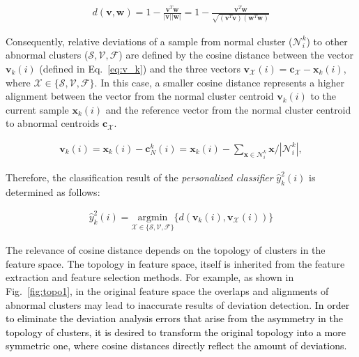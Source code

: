 \begin{align}
\label{eq:cosine}
d(\mathbf{v},\mathbf{w})= 1 - \frac{\mathbf{v}^T\mathbf{w}}{|\mathbf{v}||\mathbf{w}|}=1 - \frac{\mathbf{v}^T\mathbf{w}}{\sqrt{(\mathbf{v}^T\mathbf{v})(\mathbf{w}^T\mathbf{w})}}
\end{align}

Consequently, relative deviations of a sample from normal cluster ($\mathcal{N}_i^k$) to other abnormal clusters ($\mathcal{S},\mathcal{V},\mathcal{F}$) are defined by the cosine distance between the vector $\mathbf{v}_k(i)$ (defined in Eq.~\ref{eq:v_k}) and the three vectors $\mathbf{v}_{\mathcal{X}}(i)=\mathbf{c}_{\mathcal{X}}-\mathbf{x}_k(i)$, where $\mathcal{X} \in \{ \mathcal{S}, \mathcal{V}, \mathcal{F}\}$. In this case, a smaller cosine distance represents a higher alignment between the vector from the normal cluster centroid $\mathbf{v}_k(i)$ to the current sample $\mathbf{x}_k(i)$ and the reference vector from the normal cluster centroid to abnormal centroids $\mathbf{c}_{\mathcal{X}}$.


\begin{align}
\label{eq:v_k}
\mathbf{v}_k(i)=\mathbf{x}_k(i)-\mathbf{c}_N^k(i) = \mathbf{x}_k(i)- {\sum_{\mathbf{x} \in \mathcal{N}_i^k} \mathbf{x}}/{|\mathcal{N}_i^k|}, 
\end{align}

Therefore, the classification result of the \textit{personalized classifier} $\hat{y}^2_k(i)$ is determined as follows:

\begin{align}
\label{eq:personal_discrim}
\hat{y}^2_k(i) = \underset{\mathcal{X} \in \{ \mathcal{S}, \mathcal{V}, \mathcal{F} \}}{\text{argmin}}\{ d(\mathbf{v}_k(i),\mathbf{v}_{\mathcal{X}}(i)) \} 
\end{align}

The relevance of cosine distance depends on the topology of clusters in the feature space. The topology in feature space, itself is inherited from the feature extraction and feature selection methods. For example, as shown in Fig.~\ref{fig:topo1}, in the original feature space the overlaps and alignments of abnormal clusters may lead to inaccurate results of deviation detection. \textcolor{black}{In order to eliminate the deviation analysis errors that arise from the asymmetry in the topology of clusters, it is desired to transform the original topology into a more symmetric one, where cosine distances directly reflect the amount of deviations.}

